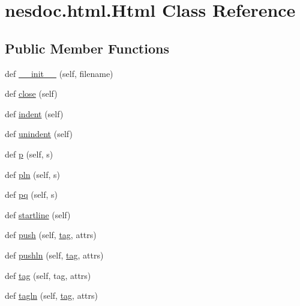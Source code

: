 \hypertarget{classnesdoc_1_1html_1_1_html}{}\section{nesdoc.\+html.\+Html Class Reference}
\label{classnesdoc_1_1html_1_1_html}
\subsection*{Public Member Functions}
\begin{DoxyCompactItemize}
\item 
def \hyperlink{classnesdoc_1_1html_1_1_html_a55fc478e8c5a0f48fc9f582fee9ed165}{\+\_\+\+\_\+init\+\_\+\+\_\+} (self, filename)
\item 
def \hyperlink{classnesdoc_1_1html_1_1_html_a6c4384a457c7d0cb9c322db8df7d48d5}{close} (self)
\item 
def \hyperlink{classnesdoc_1_1html_1_1_html_a188927eda2d8e1014ac8b1ed410eedde}{indent} (self)
\item 
def \hyperlink{classnesdoc_1_1html_1_1_html_ad73e466debb673749ecbc729f6c051f1}{unindent} (self)
\item 
def \hyperlink{classnesdoc_1_1html_1_1_html_a4070e42c84b0f19ed514113f81f52680}{p} (self, s)
\item 
def \hyperlink{classnesdoc_1_1html_1_1_html_aeac251ec3196e5b478a099746ec506b0}{pln} (self, s)
\item 
def \hyperlink{classnesdoc_1_1html_1_1_html_a571e9176f4f3eed9fc0cb37089725924}{pq} (self, s)
\item 
def \hyperlink{classnesdoc_1_1html_1_1_html_af3fa5f559e4bc67c7da55334e5b34fa4}{startline} (self)
\item 
def \hyperlink{classnesdoc_1_1html_1_1_html_a60d8005124f6e448242bfd3ed2a8d04f}{push} (self, \hyperlink{classnesdoc_1_1html_1_1_html_a17ee63c6d39fee34d8a88e96d5922b04}{tag}, attrs)
\item 
def \hyperlink{classnesdoc_1_1html_1_1_html_a3f288ff67789ae6d747c98ce1105b61f}{pushln} (self, \hyperlink{classnesdoc_1_1html_1_1_html_a17ee63c6d39fee34d8a88e96d5922b04}{tag}, attrs)
\item 
def \hyperlink{classnesdoc_1_1html_1_1_html_a17ee63c6d39fee34d8a88e96d5922b04}{tag} (self, tag, attrs)
\item 
def \hyperlink{classnesdoc_1_1html_1_1_html_aeee85db4f13fdd0e6900502c35c668c1}{tagln} (self, \hyperlink{classnesdoc_1_1html_1_1_html_a17ee63c6d39fee34d8a88e96d5922b04}{tag}, attrs)
\item 

\end{DoxyCompactItemize}

